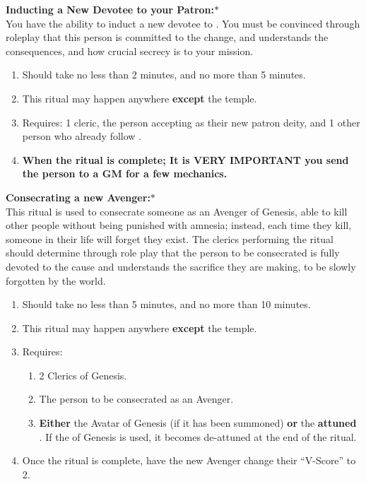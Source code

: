 \documentclass[green]{GL2020}
\begin{document}
\textbf{Inducting a New Devotee to your Patron:}$*$\\
You have the ability to induct a new devotee to \cGenesis{}. You must be convinced through roleplay that this person is committed to the change, and understands the consequences, and how crucial secrecy is to your mission.
  \begin{enumerate}
    \item Should take no less than 2 minutes, and no more than 5 minutes.
    \item This ritual may happen anywhere \textbf{except} the temple.
    \item Requires: 1 cleric, the person accepting \cGenesis{} as their new patron deity, and 1 other person who already follow \cGenesis{}.
	\item \textbf{When the ritual is complete; It is VERY IMPORTANT you send the person to a GM for a few mechanics.}
  \end{enumerate}
  
\textbf{Consecrating a new Avenger:}$*$\\
This ritual is used to consecrate someone as an Avenger of Genesis, able to kill other people without being punished with amnesia; instead, each time they kill, someone in their life will forget they exist. The clerics performing the ritual should determine through role play that the person to be consecrated is fully devoted to the cause and understands the sacrifice they are making, to be slowly forgotten by the world.
  \begin{enumerate}
    \item Should take no less than 5 minutes, and no more than 10 minutes.
    \item This ritual may happen anywhere \textbf{except} the temple.
    \item Requires:
    \begin{enumerate}
    	\item 2 Clerics of Genesis.
			\item The person to be consecrated as an Avenger.
			\item \textbf{Either} the Avatar of Genesis (if it has been summoned) \textbf{or} the \textbf{attuned} \iHorseshoe{}. If the \iHorseshoe{} of Genesis is used, it becomes de-attuned at the end of the ritual.
    \end{enumerate}
	\item Once the ritual is complete, have the new Avenger change their ``V-Score'' to 2.
 \end{enumerate}
   
\end{document}

